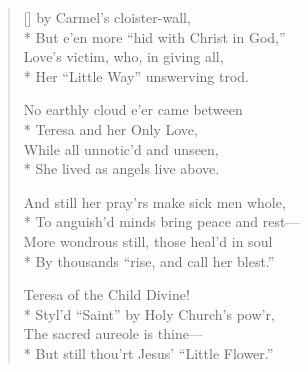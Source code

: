 \newHymn
{}

\begin{verse}[\versewidth]
 by Carmel's cloister-wall,\\*
But e'en more ``hid with Christ in God,''\\
Love's victim, who, in giving all,\\*
Her ``Little Way'' unswerving trod.

No earthly cloud e'er came between\\*
Teresa and her Only Love,\\
While all unnotic'd and unseen,\\*
She lived as angels live above.

And still her pray'rs make sick men whole,\\*
To anguish'd minds bring peace and rest---\\
More wondrous still, those heal'd in soul\\*
By thousands ``rise, and call her blest.''

Teresa of the Child Divine!\\*
Styl'd ``Saint'' by Holy Church's pow'r,\\
The sacred aureole is thine---\\*
But still thou'rt Jesus' ``Little Flower.''

\end{verse}

